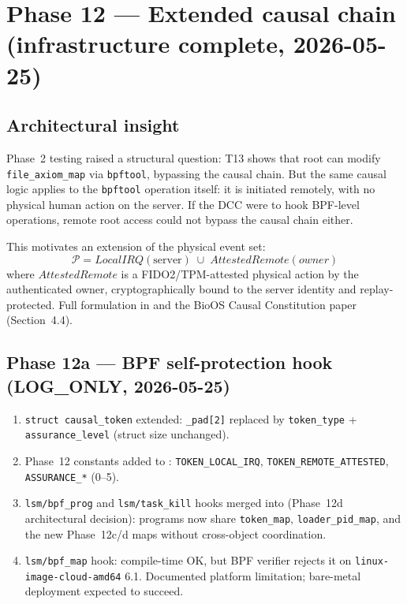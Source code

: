 \documentclass[11pt,a4paper]{article}
\theoremstyle{definition}
\begin{document}
\section{Phase 12 — Extended causal chain (infrastructure complete, 2026-05-25)}

\subsection*{Architectural insight}

Phase~2 testing raised a structural question: T13 shows that root can modify
\texttt{file\_axiom\_map} via \texttt{bpftool}, bypassing the causal chain.
But the same causal logic applies to the \texttt{bpftool} operation itself:
it is initiated remotely, with no physical human action on the server.
If the DCC were to hook BPF-level operations, remote root access could not
bypass the causal chain either.

This motivates an extension of the physical event set:
\[
  \mathcal{P} = \mathit{LocalIRQ}(\text{server})
             \;\cup\;
             \mathit{AttestedRemote}(\mathit{owner})
\]
where $\mathit{AttestedRemote}$ is a FIDO2/TPM-attested physical action by the
authenticated owner, cryptographically bound to the server identity and
replay-protected. Full formulation in  and the
BioOS Causal Constitution paper (Section~4.4).

\subsection*{Phase 12a — BPF self-protection hook (LOG\_ONLY, 2026-05-25)}

\begin{enumerate}[noitemsep]
  \item \texttt{struct causal\_token} extended: \texttt{\_pad[2]} replaced by
        \texttt{token\_type} + \texttt{assurance\_level} (struct size unchanged).
  \item Phase~12 constants added to :
        \texttt{TOKEN\_LOCAL\_IRQ}, \texttt{TOKEN\_REMOTE\_ATTESTED},
        \texttt{ASSURANCE\_*} (0--5).
  \item \texttt{lsm/bpf\_prog} and \texttt{lsm/task\_kill} hooks merged into
         (Phase~12d architectural decision): programs
        now share \texttt{token\_map}, \texttt{loader\_pid\_map}, and the new
        Phase~12c/d maps without cross-object coordination.
  \item \texttt{lsm/bpf\_map} hook: compile-time OK, but BPF verifier rejects
        it on \texttt{linux-image-cloud-amd64} 6.1.  Documented platform
        limitation; bare-metal deployment expected to succeed.
\end{enumerate}
\end{document}
